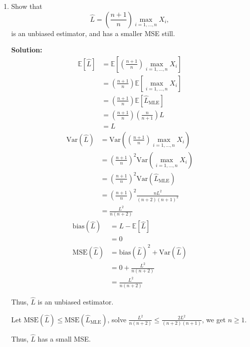 \documentclass[letter, 12pt]{article}
\begin{document}
\begin{enumerate}[wide = 0pt, label = \arabic*)]
		
		\item {Show that
		\begin{equation}
			\hat{L} = (\frac{n+1}{n})\max_{i=1,\dots,n}X_i,
		\end{equation}
		is an unbiased estimator, and has a smaller MSE still.}
		\par{\textbf{Solution:}}
		\begin{align*}
			\mathbb{E}[\hat{L}] &= \mathbb{E}[(\frac{n+1}{n})\max_{i=1,\dots,n}X_i] \\
			&= (\frac{n+1}{n})\mathbb{E}[\max_{i=1,\dots,n}X_i] \\
			&= (\frac{n+1}{n})\mathbb{E}[\hat{L}_{\text{MLE}}] \\
			&= (\frac{n+1}{n}) (\frac{n}{n+1})L \\
			&= L 
		\end{align*}
		\begin{align*}
			\text{Var}(\hat{L}) &= \text{Var}((\frac{n+1}{n})\max_{i=1,\dots,n}X_i) \\
			&= (\frac{n+1}{n})^2 \text{Var}(\max_{i=1,\dots,n}X_i) \\
			&= (\frac{n+1}{n})^2 \text{Var}(\hat{L}_{\text{MLE}}) \\
			&= (\frac{n+1}{n})^2 \frac{n L^2}{(n+2)(n+1)^2} \\
			&= \frac{L^2}{n(n+2)} 
		\end{align*}
		\begin{align*}
			\text{bias}(\hat{L}) &= L - \mathbb{E}[\hat{L}] \\
			&= 0 \\
			\text{MSE}(\hat{L}) &= \text{bias}(\hat{L})^2 + \text{Var}(\hat{L}) \\
			&= 0 + \frac{L^2}{n(n+2)} \\
			&= \frac{L^2}{n(n+2)} 
		\end{align*}
		\par{Thus, $ \hat{L} $ is an unbiased estimator.}
		\par{Let $ \text{MSE}(\hat{L}) \le \text{MSE}(\hat{L}_{\text{MLE}}) $, solve $ \frac{L^2}{n(n+2)} \le \frac{2 L^2}{(n+2)(n+1)} $, we get $ n \ge 1 $.}
		\par{Thus, $ \hat{L} $ has a small MSE.}
	\end{enumerate}
\end{document}
